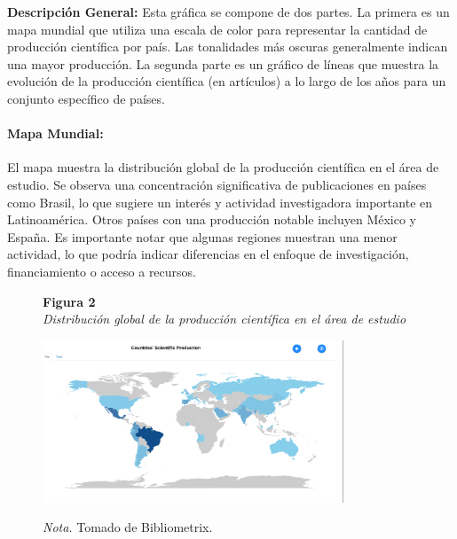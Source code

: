 \documentclass[
    letterpaper, 
    man,   
    spanish,
    12pt,
    donotrepeattitle,
    floatsintext,
    hidelinks %
]{apa7}
\begin{document}
 \textbf{Descripción General:} Esta gráfica se compone de dos partes. La primera es un mapa mundial que utiliza una escala de color para representar la cantidad de producción científica por país. Las tonalidades más oscuras generalmente indican una mayor producción. La segunda parte es un gráfico de líneas que muestra la evolución de la producción científica (en artículos) a lo largo de los años para un conjunto específico de países. 
\paragraph{Mapa Mundial:}
El mapa muestra la distribución global de la producción científica en el área de estudio. Se observa una concentración significativa de publicaciones en países como Brasil, lo que sugiere un interés y actividad investigadora importante en Latinoamérica. Otros países con una producción notable incluyen México y España. Es importante notar que algunas regiones muestran una menor actividad, lo que podría indicar diferencias en el enfoque de investigación, financiamiento o acceso a recursos. 

\begin{figure}[htbp]
    \begin{flushleft}
        \textbf{Figura 2}\\
        \textit{Distribución global de la producción científica en el área de estudio}
    \end{flushleft}
    \centering
    \includegraphics[width=0.8\textwidth]{Images/MapaBibliometrix.png}
    \vspace{0.5em}
    \begin{flushleft}
        \textit{Nota.} Tomado de Bibliometrix.
    \end{flushleft}
    \label{fig:mapa_bibliometrix}
\end{figure}
\end{document}
